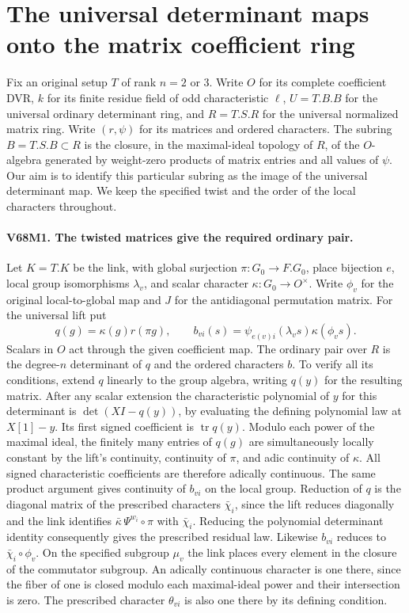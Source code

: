 \section{The universal determinant maps onto the matrix coefficient ring}

Fix an original setup $T$ of rank $n=2$ or $3$. Write $O$ for its
complete coefficient DVR, $k$ for its finite residue field of odd
characteristic $\ell$, $U=T.B.B$ for the universal ordinary determinant
ring, and $R=T.S.R$ for the universal normalized matrix ring. Write
$(r,\psi)$ for its matrices and ordered characters. The subring
$B=T.S.B\subset R$ is the closure, in the maximal-ideal topology of
$R$, of the $O$-algebra generated by weight-zero products of matrix
entries and all values of $\psi$. Our aim is to identify this particular
subring as the image of the universal determinant map. We keep the
specified twist and the order of the local characters throughout.

\paragraph{V68M1. The twisted matrices give the required ordinary pair.}
Let $K=T.K$ be the link, with global surjection $\pi:G_0\to F.G_0$,
place bijection $e$, local group isomorphisms $\lambda_v$, and scalar
character $\kappa:G_0\to O^\times$. Write $\phi_v$ for the original
local-to-global map and $J$ for the antidiagonal permutation matrix.
For the universal lift put
\[
 q(g)=\kappa(g)r(\pi g),\qquad
 b_{vi}(s)=\psi_{e(v)i}(\lambda_v s)\kappa(\phi_v s).
\]
Scalars in $O$ act through the given coefficient map. The ordinary
pair over $R$ is the degree-$n$ determinant of $q$ and the ordered
characters $b$. To verify all its conditions, extend $q$ linearly to
the group algebra, writing $q(y)$ for the resulting matrix. After
any scalar extension the characteristic polynomial of $y$ for this
determinant is $\det(XI-q(y))$, by evaluating the defining polynomial
law at $X[1]-y$. Its first signed coefficient is $\operatorname{tr}q(y)$.
Modulo each power of the maximal ideal, the finitely many entries of
$q(g)$ are simultaneously locally constant by the lift's continuity,
continuity of $\pi$, and adic continuity of $\kappa$. All signed
characteristic coefficients are therefore adically continuous. The
same product argument gives continuity of $b_{vi}$ on the local group.
Reduction of $q$ is the diagonal matrix of the prescribed characters
$\bar\chi_i$, since the lift reduces diagonally and the link identifies
$\bar\kappa\,\Psi^{w_i}\circ\pi$ with $\bar\chi_i$. Reducing the
polynomial determinant identity consequently gives the prescribed
residual law. Likewise $b_{vi}$ reduces to $\bar\chi_i\circ\phi_v$.
On the specified subgroup $\mu_v$ the link places every element in
the closure of the commutator subgroup. An adically continuous
character is one there, since the fiber of one is closed modulo each
maximal-ideal power and their intersection is zero. The prescribed
character $\theta_{vi}$ is also one there by its defining condition.

